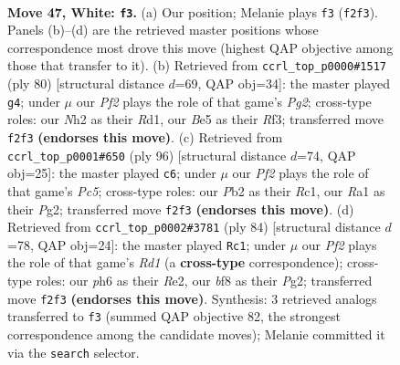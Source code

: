 \documentclass[11pt]{article}
\begin{document}
\clearpage

\begin{figure}[p]\centering
\begin{subfigure}{0.46\textwidth}\centering
\resizebox{\linewidth}{!}{%
\newchessgame
\chessboard[
  setfen={5br1/1r1k2p1/p1p4p/Pp1bBp2/2p4P/4P1P1/1P1K1P1N/R5R1 w - - 10 47},
  showmover=false,
  pgfstyle=straightmove, color=movearrow, markmove={f2-f3}
]}
\caption{}
\end{subfigure}\hfill
\begin{subfigure}{0.46\textwidth}\centering
\resizebox{\linewidth}{!}{%
\newchessgame
\chessboard[
  setfen={1r2b3/4bpk1/p5p1/PppB3p/8/2P2R1P/5PP1/3R1K2 w - - 0 41},
  showmover=false,
  pgfstyle=straightmove, color=movearrow, markmove={g2-g4}
]}
\caption{}
\end{subfigure}
\\[4pt]
\begin{subfigure}{0.46\textwidth}\centering
\resizebox{\linewidth}{!}{%
\newchessgame
\chessboard[
  setfen={8/1p1r2pk/p4p2/P1Ppb2p/1P3p2/7P/3B1PP1/2R2K2 w - - 2 49},
  showmover=false,
  pgfstyle=straightmove, color=movearrow, markmove={c5-c6}
]}
\caption{}
\end{subfigure}\hfill
\begin{subfigure}{0.46\textwidth}\centering
\resizebox{\linewidth}{!}{%
\newchessgame
\chessboard[
  setfen={r1k2r2/1npb4/2pb1p2/p5p1/N2B3p/1P1B1P1P/P3R1P1/3R1K2 w - - 35 43},
  showmover=false,
  pgfstyle=straightmove, color=movearrow, markmove={d1-c1}
]}
\caption{}
\end{subfigure}
\caption{\textbf{Move 47, White: \texttt{f3}.} (a) Our position; Melanie plays \texttt{f3} (\texttt{f2f3}). Panels (b)--(d) are the retrieved master positions whose correspondence most drove this move (highest QAP objective among those that transfer to it). (b) Retrieved from \texttt{ccrl\_top\_p0000\#1517} (ply 80) [structural distance $d$=69, QAP obj=34]: the master played \texttt{g4}; under $\mu$ our \emph{Pf2} plays the role of that game's \emph{Pg2}; cross-type roles: our \emph{N}h2 as their \emph{R}d1, our \emph{B}e5 as their \emph{R}f3; transferred move \texttt{f2f3} \textbf{(endorses this move)}. (c) Retrieved from \texttt{ccrl\_top\_p0001\#650} (ply 96) [structural distance $d$=74, QAP obj=25]: the master played \texttt{c6}; under $\mu$ our \emph{Pf2} plays the role of that game's \emph{Pc5}; cross-type roles: our \emph{P}b2 as their \emph{R}c1, our \emph{R}a1 as their \emph{P}g2; transferred move \texttt{f2f3} \textbf{(endorses this move)}. (d) Retrieved from \texttt{ccrl\_top\_p0002\#3781} (ply 84) [structural distance $d$=78, QAP obj=24]: the master played \texttt{Rc1}; under $\mu$ our \emph{Pf2} plays the role of that game's \emph{Rd1} (a \textbf{cross-type} correspondence); cross-type roles: our \emph{p}h6 as their \emph{R}e2, our \emph{b}f8 as their \emph{P}g2; transferred move \texttt{f2f3} \textbf{(endorses this move)}. Synthesis: 3 retrieved analogs transferred to \texttt{f3} (summed QAP objective 82, the strongest correspondence among the candidate moves); Melanie committed it via the \texttt{search} selector.}
\label{fig:thought-m92}
\end{figure}
\end{document}
